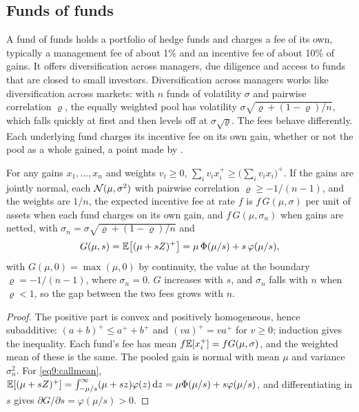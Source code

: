 \begin{chapterrefs}
\FloatBarrier
\section{Funds of funds}
\label{sec9:fof}

A fund of funds holds a portfolio of hedge funds and charges a fee of its own, typically a management
fee of about 1\% and an incentive fee of about 10\% of gains. It offers diversification across
managers, due diligence and access to funds that are closed to small investors. Diversification
across managers works like diversification across markets: with $n$ funds of volatility $\sigma$ and
pairwise correlation $\varrho$, the equally weighted pool has volatility $\sigma\sqrt{\varrho+(1-\varrho)/n}$,
which falls quickly at first and then levels off at $\sigma\sqrt\varrho$. The fees behave differently.
Each underlying fund charges its incentive fee on its own gain, whether or not the pool as a whole
gained, a point made by \textcite{brown2003}.

\begin{proposition}\label{prop9:netting}
For any gains $x_1,\dots,x_n$ and weights $v_i\ge0$, $\sum_iv_ix_i^+\ge\bigl(\sum_iv_ix_i\bigr)^+$. If the gains are
jointly normal, each $\mathcal{N}(\mu,\sigma^2)$ with pairwise correlation $\varrho\ge-1/(n-1)$, and the weights are $1/n$, the
expected incentive fee at rate $f$ is $f\,G(\mu,\sigma)$ per unit of assets when each fund charges on its own
gain, and $f\,G(\mu,\sigma_n)$ when gains are netted, with $\sigma_n=\sigma\sqrt{\varrho+(1-\varrho)/n}$ and
\begin{equation}\label{eq9:callmean}
  G(\mu,s)=\mathbb{E}\bigl[(\mu+sZ)^+\bigr]=\mu\,\Phi(\mu/s)+s\,\varphi(\mu/s),
\end{equation}
with $G(\mu,0)=\max(\mu,0)$ by continuity, the value at the boundary $\varrho=-1/(n-1)$, where $\sigma_n=0$.
$G$ increases with $s$, and $\sigma_n$ falls with $n$ when $\varrho<1$, so the gap between the two fees grows with $n$.
\end{proposition}

\begin{proof}
The positive part is convex and positively homogeneous, hence subadditive:
$(a+b)^+\le a^++b^+$ and $(va)^+=va^+$ for $v\ge0$; induction gives the inequality. Each fund's fee has
mean $f\mathbb{E}[x_i^+]=fG(\mu,\sigma)$, and the weighted mean of these is the same. The pooled gain is normal with
mean $\mu$ and variance $\sigma_n^2$. For \cref{eq9:callmean}, $\mathbb{E}[(\mu+sZ)^+]=\int_{-\mu/s}^\infty(\mu+sz)\varphi(z)\,\mathrm{d} z
=\mu\Phi(\mu/s)+s\varphi(\mu/s)$, and differentiating in $s$ gives $\partial G/\partial s=\varphi(\mu/s)>0$.
\end{proof}


\end{chapterrefs}
